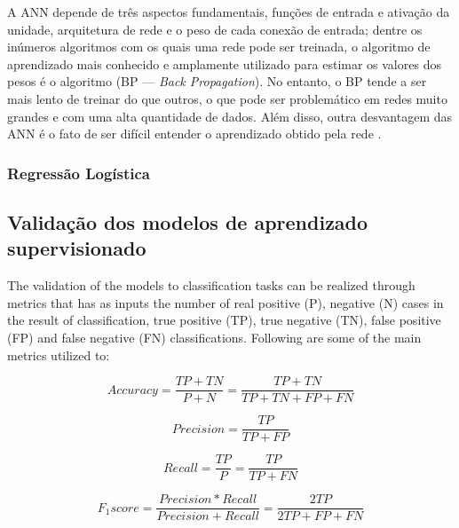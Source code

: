 \documentclass[
	12pt,				%
	oneside,			%
	a4paper,			%
	english,			%
	brazil				%
	]{abntex2ppgsi}
\begin{document}
A ANN depende de três aspectos fundamentais, funções de entrada e ativação da unidade, arquitetura de rede e o peso de cada conexão de entrada; dentre os inúmeros  algoritmos com os quais uma rede pode ser treinada, o algoritmo de aprendizado mais conhecido e amplamente utilizado para estimar os valores dos pesos é o algoritmo (BP --- \textit{Back Propagation}). No entanto, o BP tende a ser mais lento de treinar do que outros, o que pode ser problemático em redes muito grandes e com uma alta quantidade de dados. Além disso, outra desvantagem das ANN é o fato de ser difícil entender o aprendizado obtido pela rede \cite{kotsiantis2006machine, singh2016review}.

\subsubsection{Regressão Logística}



\subsection{Validação dos modelos de aprendizado supervisionado}
\label{modelValidation}

The validation of the models to classification tasks can be realized through metrics that has as inputs the number of real positive (P), negative (N) cases in the result of classification, true positive (TP), true negative (TN), false positive (FP) and false negative (FN) classifications. Following are some of the main metrics utilized to:

\begin{equation}
Accuracy = \frac{TP + TN}{P + N} = \frac{TP + TN}{TP + TN + FP + FN}
\end{equation}

\begin{equation}
Precision = \frac{TP}{TP + FP}
\end{equation}

\begin{equation}
Recall = \frac{TP}{P} = \frac{TP}{TP + FN}
\end{equation}

\begin{equation}
F_1 score = \frac{Precision * Recall}{Precision + Recall} = \frac{2TP}{2TP + FP + FN}
\end{equation}
\end{document}
